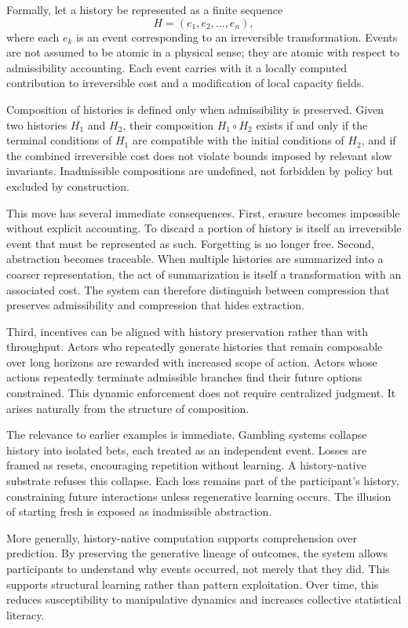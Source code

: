 \documentclass[12pt,oneside]{book}
\begin{document}
Formally, let a history be represented as a finite sequence
\[
H = (e_1, e_2, \dots, e_n),
\]
where each \(e_k\) is an event corresponding to an irreversible transformation. Events are not assumed to be atomic in a physical sense; they are atomic with respect to admissibility accounting. Each event carries with it a locally computed contribution to irreversible cost and a modification of local capacity fields.

Composition of histories is defined only when admissibility is preserved. Given two histories \(H_1\) and \(H_2\), their composition \(H_1 \circ H_2\) exists if and only if the terminal conditions of \(H_1\) are compatible with the initial conditions of \(H_2\), and if the combined irreversible cost does not violate bounds imposed by relevant slow invariants. Inadmissible compositions are undefined, not forbidden by policy but excluded by construction.

This move has several immediate consequences. First, erasure becomes impossible without explicit accounting. To discard a portion of history is itself an irreversible event that must be represented as such. Forgetting is no longer free. Second, abstraction becomes traceable. When multiple histories are summarized into a coarser representation, the act of summarization is itself a transformation with an associated cost. The system can therefore distinguish between compression that preserves admissibility and compression that hides extraction.

Third, incentives can be aligned with history preservation rather than with throughput. Actors who repeatedly generate histories that remain composable over long horizons are rewarded with increased scope of action. Actors whose actions repeatedly terminate admissible branches find their future options constrained. This dynamic enforcement does not require centralized judgment. It arises naturally from the structure of composition.

The relevance to earlier examples is immediate. Gambling systems collapse history into isolated bets, each treated as an independent event. Losses are framed as resets, encouraging repetition without learning. A history-native substrate refuses this collapse. Each loss remains part of the participant’s history, constraining future interactions unless regenerative learning occurs. The illusion of starting fresh is exposed as inadmissible abstraction.

More generally, history-native computation supports comprehension over prediction. By preserving the generative lineage of outcomes, the system allows participants to understand why events occurred, not merely that they did. This supports structural learning rather than pattern exploitation. Over time, this reduces susceptibility to manipulative dynamics and increases collective statistical literacy.
\end{document}
